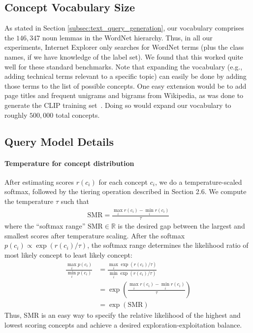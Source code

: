 \subsection{Concept Vocabulary Size}
\label{sec:concept_vocab_size}
As stated in Section \ref{subsec:text_query_generation}, our vocabulary comprises the $146{,}347$ noun lemmas in the WordNet hierarchy. Thus, in all our experiments, Internet Explorer only searches for WordNet terms (plus the class names, if we have knowledge of the label set). We found that this worked quite well for these standard benchmarks. Note that expanding the vocabulary (e.g., adding technical terms relevant to a specific topic) can easily be done by adding those terms to the list of possible concepts. One easy extension would be to add page titles and frequent unigrams and bigrams from Wikipedia, as was done to generate the CLIP training set~\cite{radford2021learning}. Doing so would expand our vocabulary to roughly $500{,}000$ total concepts. 

\subsection{Query Model Details}
\label{sec:query_model_details}
\paragraph{Temperature for concept distribution}
After estimating scores $r(c_i)$ for each concept $c_i$, we do a temperature-scaled softmax, followed by the tiering operation described in Section 2.6. We compute the temperature $\tau$ such that 
\begin{align}
     \text{SMR} = \frac{\max_i r(c_i) - \min_i r(c_i)}{\tau}
\end{align}
where the ``softmax range'' $\text{SMR} \in \mathbb R$ is the desired gap between the largest and smallest scores after temperature scaling. After the softmax $p(c_i) \propto \exp(r(c_i) / \tau)$, the softmax range determines the likelihood ratio of most likely concept to least likely concept: 
\begin{align}
    \frac{\max_i p(c_i)}{\min_i p(c_i)} &= \frac{\max_i \exp(r(c_i) / \tau)}{\min_i \exp(r(c_i) / \tau)} \\
      &= \exp \left(\frac{\max_i r(c_i) - \min_i r(c_i)}{\tau}\right) \\
    &= \exp(\text{SMR})
\end{align}
Thus, SMR is an easy way to specify the relative likelihood of the highest and lowest scoring concepts and achieve a desired exploration-exploitation balance. 


